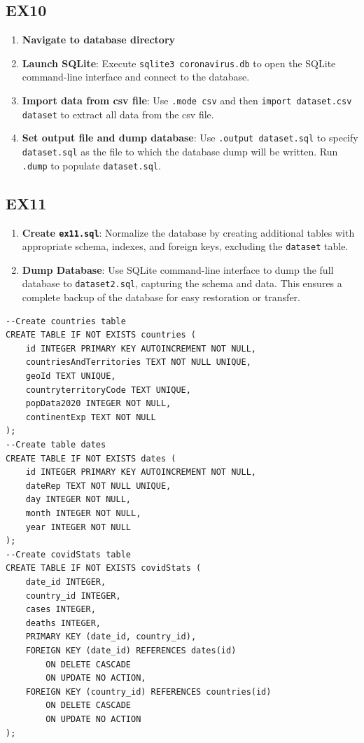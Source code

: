 \documentclass[12pt,oneside,a4paper,english]{article}
\begin{document}
\subsection{EX10}
\begin{enumerate}
    \item \textbf{Navigate to database directory}
        
    \item \textbf{Launch SQLite}:
    Execute \texttt{sqlite3 coronavirus.db} to open the SQLite command-line interface and connect to the database.
        
    \item \textbf{Import data from csv file}:
    Use \texttt{.mode csv} and then \texttt{import dataset.csv dataset} to extract all data from the csv file.
        
    \item \textbf{Set output file and dump database}:
    Use \texttt{.output dataset.sql} to specify \texttt{dataset.sql} as the file to which the database dump will be written.
    Run \texttt{.dump} to populate \texttt{dataset.sql}.
\end{enumerate}



\subsection{EX11}
\begin{enumerate}
    \item \textbf{Create \texttt{ex11.sql}}: Normalize the database by creating additional tables with appropriate schema, indexes, and foreign keys, excluding the \texttt{dataset} table.
    
    \item \textbf{Dump Database}: Use SQLite command-line interface to dump the full database to \texttt{dataset2.sql}, capturing the schema and data. This ensures a complete backup of the database for easy restoration or transfer.
\end{enumerate}
\begin{lstlisting}
--Create countries table
CREATE TABLE IF NOT EXISTS countries (
	id INTEGER PRIMARY KEY AUTOINCREMENT NOT NULL,
	countriesAndTerritories TEXT NOT NULL UNIQUE,
	geoId TEXT UNIQUE,
	countryterritoryCode TEXT UNIQUE,
	popData2020 INTEGER NOT NULL,
	continentExp TEXT NOT NULL
);
--Create table dates
CREATE TABLE IF NOT EXISTS dates (
	id INTEGER PRIMARY KEY AUTOINCREMENT NOT NULL,
	dateRep TEXT NOT NULL UNIQUE,
	day INTEGER NOT NULL,
	month INTEGER NOT NULL,
	year INTEGER NOT NULL
);
--Create covidStats table
CREATE TABLE IF NOT EXISTS covidStats (
	date_id INTEGER,
	country_id INTEGER,
	cases INTEGER,
	deaths INTEGER,
	PRIMARY KEY (date_id, country_id),
	FOREIGN KEY (date_id) REFERENCES dates(id)
		ON DELETE CASCADE
		ON UPDATE NO ACTION,
	FOREIGN KEY (country_id) REFERENCES countries(id)
		ON DELETE CASCADE
		ON UPDATE NO ACTION
);
\end{lstlisting}
\end{document}
